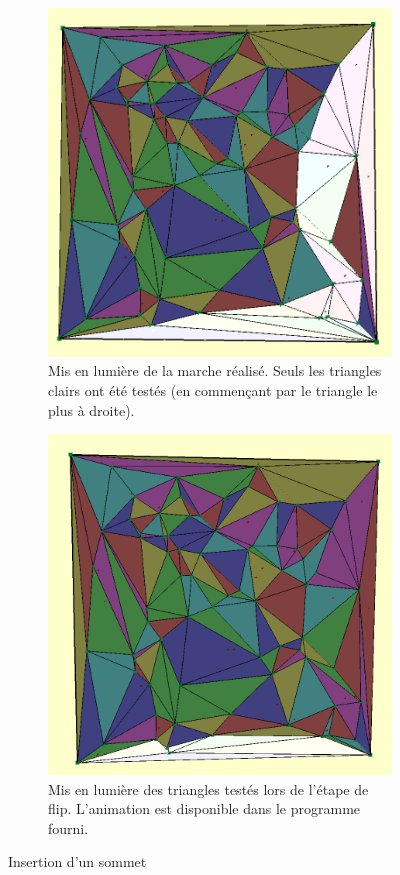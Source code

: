 \documentclass[12pt,a4paper,twoside]{report}
\begin{document}
\begin{figure}[H]
	\centering
	\begin{subfigure}{.4\textwidth}
		\centering
		\includegraphics[width=\textwidth]{marche.png}
		\caption{Mis en lumière de la marche réalisé. Seuls les triangles clairs ont été testés (en commençant par le triangle le plus à droite).}			
		\label{fig:marche}
	\end{subfigure}
	\begin{subfigure}{.4\textwidth}
		\centering
		\includegraphics[width=\textwidth]{flip.png}
		\caption{Mis en lumière des triangles testés lors de l'étape de flip. L'animation est disponible dans le programme fourni.}					
		\label{fig:flip}
	\end{subfigure}
	\caption{Insertion d'un sommet}
\end{figure}
\end{document}
